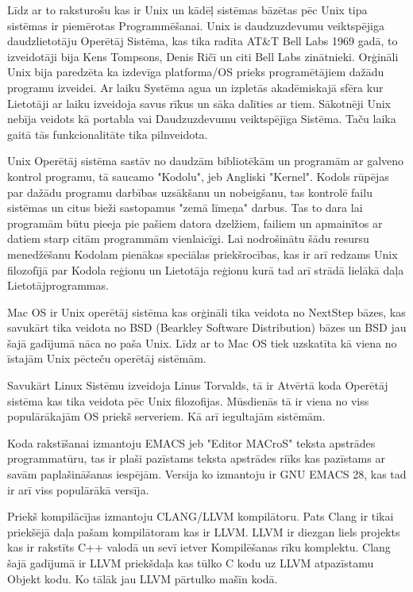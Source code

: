 \documentclass[12pt]{article}
\begin{document}
    Līdz ar to raksturošu kas ir Unix un kādēļ sistēmas bāzētas pēc Unix tipa sistēmas ir piemērotas Programmēšanai. Unix is daudzuzdevumu veiktspējiga daudzlietotāju Operētāj Sistēma, kas tika radīta AT&T Bell Labs 1969 gadā, to izveidotāji bija Kens Tompsons, Denis Ričī un citi Bell Labs zinātnieki. Orģināli Unix bija paredzēta ka izdevīga platforma/OS prieks programētājiem dažādu programu izveidei. Ar laiku Systēma agua un izpletās akadēmiskajā sfēra kur Lietotāji ar laiku izveidoja savus rīkus un sāka dalīties ar tiem. Sākotnēji Unix nebīja veidots kā portabla vai Daudzuzdevumu veiktspējīga Sistēma. Taču laika gaitā tās funkcionalitāte tika pilnveidota. 

Unix Operētāj sistēma sastāv no daudzām bibliotēkām un programām ar galveno kontrol programu, tā saucamo "Kodolu", jeb Angliski "Kernel". Kodols rūpējas par dažādu programu darbības uzsākšanu un nobeigšanu, tas kontrolē failu sistēmas un citus bieži sastopamus "zemā līmeņa" darbus. Tas to dara lai programām būtu pieeja pie pašiem datora dzelžiem, failiem un apmainītos ar datiem starp citām programmām vienlaicīgi. Lai nodrošinātu šādu resursu menedžēšanu Kodolam pienākas speciālas priekšrocības, kas ir arī redzams Unix filozofījā par Kodola reģionu un Lietotāja reģionu kurā tad arī strādā lielākā daļa Lietotājprogrammas.

Mac OS ir Unix operētāj sistēma kas orģināli tika veidota no NextStep bāzes, kas savukārt tika veidota no BSD (Bearkley Software Distribution) bāzes un BSD jau šajā gadījumā nāca no paša Unix. Līdz ar to Mac OS tiek uzskatīta kā viena no īstajām Unix pēcteču operētāj sistēmām. 

Savukārt Linux Sistēmu izveidoja Linus Torvalds, tā ir Atvērtā koda Operētāj sistēma kas tika veidota pēc Unix filozofijas. Mūsdienās tā ir viena no viss populārākajām OS priekš serveriem. Kā arī iegultajām sistēmām.

Koda rakstīšanai izmantoju EMACS jeb "Editor MACroS" teksta apstrādes programmatūru,	 tas ir plaši pazīstams teksta apstrādes riīks kas pazīstams ar savām paplašināšanas iespējām. Versija ko izmantoju ir GNU EMACS 28, kas tad ir arī viss populārākā versīja.

Priekš kompilācījas izmantoju CLANG/LLVM kompilātoru. Pats Clang ir tikai priekšējā daļa pašam kompilātoram kas ir LLVM. LLVM ir diezgan liels projekts kas ir rakstīts C++ valodā un sevī ietver Kompilēšanas rīku komplektu. Clang šajā gadījumā ir LLVM priekšdaļa kas tūlko C kodu uz LLVM atpazīstamu Objekt kodu. Ko tālāk jau LLVM pārtulko mašīn kodā.
	
\end{document}
